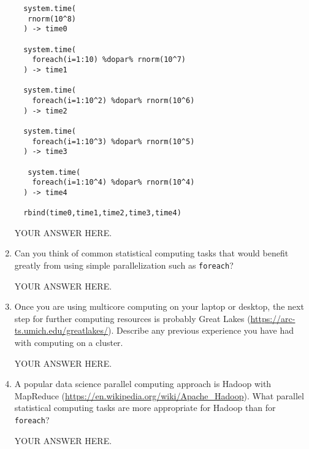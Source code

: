 \documentclass[12pt]{article}
\begin{document}
\begin{enumerate}
\begin{verbatim}
  system.time(
   rnorm(10^8)
  ) -> time0

  system.time(
    foreach(i=1:10) %dopar% rnorm(10^7)
  ) -> time1

  system.time(
    foreach(i=1:10^2) %dopar% rnorm(10^6)
  ) -> time2

  system.time(
    foreach(i=1:10^3) %dopar% rnorm(10^5)
  ) -> time3

   system.time(
    foreach(i=1:10^4) %dopar% rnorm(10^4)
  ) -> time4
  
  rbind(time0,time1,time2,time3,time4)
\end{verbatim}

  YOUR ANSWER HERE.

\item Can you think of common statistical computing tasks that would benefit greatly from using simple parallelization such as \texttt{foreach}?
  
YOUR ANSWER HERE.

\item Once you are using multicore computing on your laptop or desktop, the next step for further computing resources is probably Great Lakes (\url{https://arc-ts.umich.edu/greatlakes/}). Describe any previous experience you have had with computing on a cluster.

  YOUR ANSWER HERE.

\item A popular data science parallel computing approach is Hadoop with MapReduce (\url{https://en.wikipedia.org/wiki/Apache_Hadoop}). What parallel statistical computing tasks are more appropriate for Hadoop than for \texttt{foreach}?

  YOUR ANSWER HERE.
  
\end{enumerate}
\end{document}
